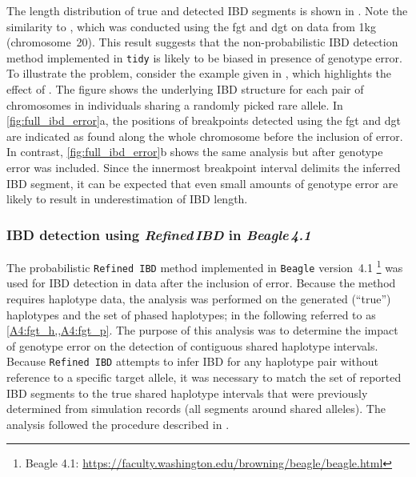 The length distribution of true and detected IBD segments is shown in .
Note the similarity to , which was conducted using the \gls{fgt} and \gls{dgt} on data from \gls{1kg} (chromosome~20).
This result suggests that the non-probabilistic IBD detection method implemented in \texttt{tidy} is likely to be biased in presence of genotype error.
To illustrate the problem, consider the example given in , which highlights the effect of .
The figure shows the underlying IBD structure for each pair of chromosomes in  individuals sharing a randomly picked rare allele.
In \cref{fig:full_ibd_error}{a}, the positions of breakpoints detected using the \gls{fgt} and \gls{dgt} are indicated as found along the whole chromosome before the inclusion of error.
In contrast, \cref{fig:full_ibd_error}{b} shows the same analysis but after genotype error was included.
Since the innermost breakpoint interval delimits the inferred IBD segment, it can be expected that even small amounts of genotype error are likely to result in underestimation of IBD length.

%

%


%
\subsubsection{IBD detection using \emph{Refined\,IBD} in \emph{Beagle\,4.1}}
%


The probabilistic \texttt{Refined\,IBD} method implemented in \texttt{Beagle} version~4.1 \citep{Browning:2013eh}\footnote{Beagle 4.1: \url{https://faculty.washington.edu/browning/beagle/beagle.html} } was used for IBD detection in data after the inclusion of error.
Because the method requires haplotype data, the analysis was performed on the generated (``true'') haplotypes and the set of phased haplotypes; in the following referred to as \cref{A4:fgt_h,,A4:fgt_p}.
The purpose of this analysis was to determine the impact of genotype error on the detection of contiguous shared haplotype intervals.
Because \texttt{Refined\,IBD} attempts to infer IBD for any haplotype pair without reference to a specific target allele, it was necessary to match the set of reported IBD segments to the true shared haplotype intervals that were previously determined from simulation records (\ie all segments around shared \fk{[2,25]} alleles).
The analysis followed the procedure described in .


